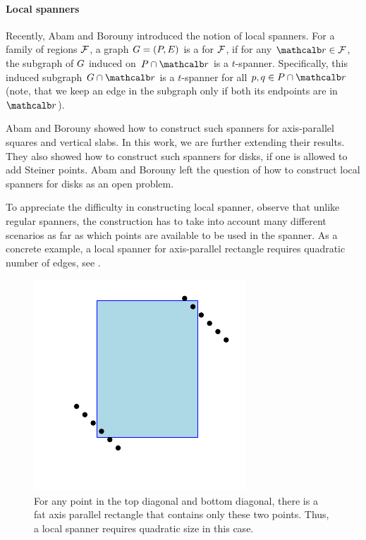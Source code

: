 \documentclass[12pt]{article}%
\begin{document}
\paragraph{Local spanners}

Recently, Abam and Borouny \cite{ab-lgs-21} introduced the notion of
local spanners.  For a family of regions $\mathcal{F}$, a graph
$G = (P,E)$ is a  for $\mathcal{F}$, if for any
$\region \in \FF$, the subgraph of $G$ induced on $\PS \cap \region$
is a $t$-spanner.  Specifically, this induced subgraph
$ \restrictY{\G}{\region}$ is a $t$-spanner for all
$\pa,\pb \in \PS \cap \region$ (note, that we keep an edge in the
subgraph only if both its endpoints are in $\region$).

Abam and Borouny \cite{ab-lgs-21} showed how to construct such
spanners for axis-parallel squares and vertical slabs. In this work,
we are further extending their results.  They also showed how to
construct such spanners for disks, if one is allowed to add Steiner
points. Abam and Borouny left the question of how to construct local
spanners for disks as an open problem.

To appreciate the difficulty in constructing local spanner, observe
that unlike regular spanners, the construction has to take into
account many different scenarios as far as which points are available
to be used in the spanner. As a concrete example, a local spanner for
axis-parallel rectangle requires quadratic number of edges, see
.

\begin{figure}[h]
    \centerline{\includegraphics{figs/local_rectangles}}
    \caption{For any point in the top diagonal and bottom diagonal,
       there is a fat axis parallel rectangle that contains only these
       two points. Thus, a local spanner requires quadratic size in
       this case.  }
\end{figure}
\end{document}
